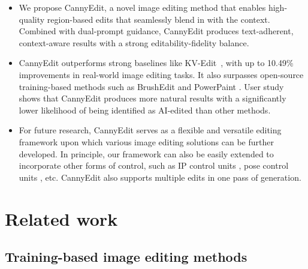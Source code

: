 \documentclass{article}
\begin{document}
\vspace{-1mm}
\begin{itemize}[leftmargin=5mm]
\item We propose CannyEdit, a novel image editing method 
that enables high-quality region-based edits that seamlessly blend in with the context. Combined with dual-prompt guidance, CannyEdit produces text-adherent, context-aware results with a strong editability-fidelity balance.

\vspace{-1mm}

\item CannyEdit outperforms strong baselines like KV-Edit~\citep{zhu2025kv}, with up to 10.49\% improvements in real-world image editing tasks. It also surpasses open-source training-based methods such as BrushEdit \citep{li2024brushedit} and PowerPaint \citep{zhuang2023task}. User study shows that CannyEdit produces more natural results with a significantly lower likelihood of being identified as AI-edited than other methods.


\vspace{-1mm}

\item For future research, CannyEdit serves as a flexible and versatile editing framework upon which various image editing solutions can be further developed.
In principle, our framework can also be easily extended to incorporate other forms of control, such as IP control units \cite{ye2023ip,wang2024instantid}, pose control units \cite{wang2024stablepose,buchheim2025controlling}, etc. CannyEdit also supports multiple edits in one pass of generation.

\end{itemize}

\section{Related work}
\subsection{Training-based image editing methods}
\end{document}

